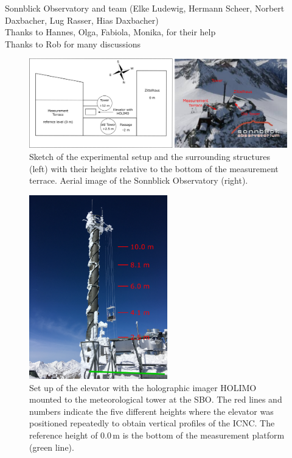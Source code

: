 \documentclass[draft,linenumbers]{agujournal}
\begin{document}
\begin{acronyms}
\end{acronyms}


\acknowledgments
Sonnblick Observatory and team (Elke Ludewig, Hermann Scheer, Norbert Daxbacher, Lug Rasser, Hias Daxbacher)\\
Thanks to Hannes, Olga, Fabiola, Monika, for their help\\
Thanks to Rob for many discussions



\newpage

\begin{figure}[t]
 \centering
 	\includegraphics[width=14cm]{SONSetUp.png}
 \caption{Sketch of the experimental setup and the surrounding structures (left) with their heights relative to the bottom of the measurement terrace. Aerial image of the Sonnblick Observatory (right).}
 \label{fig:SetUp}
\end{figure}

\begin{figure}[t]
 \centering
 	\includegraphics[width=6cm]{tower.png}
 \caption{Set up of the elevator with the holographic imager HOLIMO mounted to the meteorological tower at the SBO. The red lines and numbers indicate the five different heights where the elevator was positioned repeatedly to obtain vertical profiles of the ICNC. The reference height of 0.0\,\si{m} is the bottom of the measurement platform (green line).}
 \label{fig:Elevator}
\end{figure}
\end{document}
